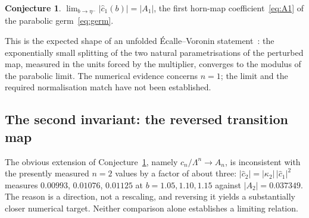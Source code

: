 \documentclass[11pt,a4paper]{article}
\theoremstyle{definition}
\newtheorem{conjecture}[theorem]{Conjecture}
\newcommand{\chat}{\hat{c}_1}
\begin{document}
\begin{conjecture}\label{conj:horn}
$\displaystyle\lim_{b\to\eta^{-}}|\chat(b)|=|A_1|$, the first horn-map
coefficient~\eqref{eq:A1} of the parabolic germ~\eqref{eq:germ}.
\end{conjecture}

This is the expected shape of an unfolded \'Ecalle--Voronin
statement~\cite{MRR2004,RousseauTeyssier2008}: the exponentially small splitting
of the two natural parametrisations of the perturbed map, measured in the units
forced by the multiplier, converges to the modulus of the parabolic limit.  The numerical evidence concerns $n=1$; the limit and the required
normalisation match have not been established.

\subsection{The second invariant: the reversed transition map}\label{sec:mode2}

The obvious extension of Conjecture~\ref{conj:horn}, namely
$c_n/\Lambda^{n}\to A_n$, is inconsistent with the presently measured $n=2$ values by a factor of about three:
$|\hat c_2|=|\kappa_2|\,|\chat|^{2}$ measures $0.00993$, $0.01076$, $0.01125$ at
$b=1.05,1.10,1.15$ against $|A_2|=0.037349$.  The reason is a direction, not a
rescaling, and reversing it yields a substantially closer numerical target.
Neither comparison alone establishes a limiting relation.
\end{document}
